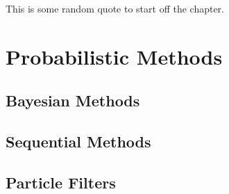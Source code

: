 \begin{savequote}[75mm]
This is some random quote to start off the chapter.
\end{savequote}

\chapter{Probabilistic Methods}
\section{Bayesian Methods}
\section{Sequential Methods}
\section{Particle Filters}
